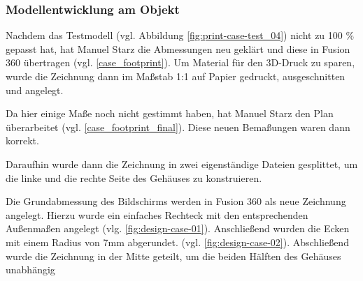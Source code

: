 \subsubsection{Modellentwicklung am Objekt}
Nachdem das Testmodell (vgl. Abbildung \ref{fig:print-case-test_04}) nicht zu 100 \% gepasst hat, hat Manuel Starz die Abmessungen neu geklärt und diese in Fusion 360 übertragen (vgl. \ref{case_footprint}). Um Material für den 3D-Druck zu sparen, wurde die Zeichnung dann im Maßstab 1:1 auf Papier gedruckt, ausgeschnitten und angelegt.\par
Da hier einige Maße noch nicht gestimmt haben, hat Manuel Starz den Plan überarbeitet (vgl. \ref{case_footprint_final}). Diese neuen Bemaßungen waren dann korrekt.\par
Daraufhin wurde dann die Zeichnung in zwei eigenständige Dateien gesplittet, um die linke und die rechte Seite des Gehäuses zu konstruieren.\par
Die Grundabmessung des Bildschirms werden in Fusion 360 als neue Zeichnung angelegt. Hierzu wurde ein einfaches Rechteck mit den entsprechenden Außenmaßen angelegt (vlg. \ref{fig:design-case-01}). Anschließend wurden die Ecken mit einem Radius von 7mm abgerundet. (vgl. \ref{fig:design-case-02}). Abschließend wurde die Zeichnung in der Mitte geteilt, um die beiden Hälften des Gehäuses unabhängig\par
